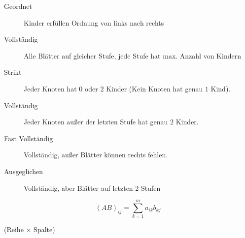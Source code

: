 \documentclass[uniLeipzig]{merkzettel}
\begin{document}
\begin{mzImportant}
  \begin{description}
    \item[Geordnet] Kinder erfüllen Ordnung von links nach rechts

    \item[Vollständig]
      Alle Blätter auf gleicher Stufe, jede Stufe hat max. Anzahl von Kindern
  \end{description}
\end{mzImportant}

\begin{mzImportant}
  \begin{description}
    \item[Strikt]
      Jeder Knoten hat $0$ oder $2$ Kinder (Kein Knoten hat genau $1$ Kind).

    \item[Vollständig]
      Jeder Knoten au\ss er der letzten Stufe hat genau $2$ Kinder.

    \item[Fast Vollständig]
      Vollständig, außer Blätter können rechts fehlen.

    \item[Ausgeglichen]
      Vollständig, aber Blätter auf letzten $2$ Stufen
  \end{description}
\end{mzImportant}

\begin{mzImportant}
  $$(AB)_{ij} = \sum_{k=1}^m a_{ik}b_{kj}$$

  (Reihe $\times$ Spalte)
\end{mzImportant}
\end{document}
